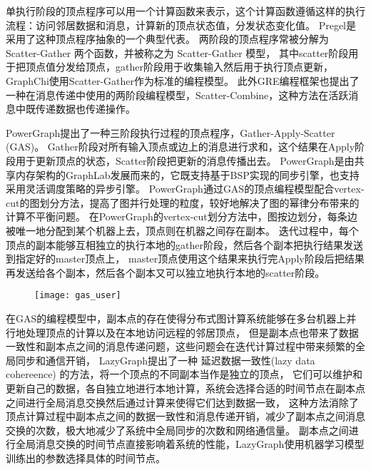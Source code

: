 单执行阶段的顶点程序可以用一个计算函数来表示，这个计算函数遵循这样的执行流程：访问邻居数据和消息，计算新的顶点状态值，分发状态变化值。
Pregel是采用了这种顶点程序抽象的一个典型代表。
两阶段的顶点程序常被分解为 Scatter-Gather 两个函数，并被称之为 Scatter-Gather 模型，
其中scatter阶段用于把顶点值分发给顶点，gather阶段用于收集输入然后用于执行顶点更新，
GraphChi\cite{GraphChi}使用Scatter-Gather作为标准的编程模型。
此外GRE\cite{GRE}编程框架也提出了一种在消息传递中使用的两阶段编程模型，Scatter-Combine，这种方法在活跃消息中既传递数据也传递操作。

PowerGraph\cite{Gonzalez@OSDI12}提出了一种三阶段执行过程的顶点程序，Gather-Apply-Scatter (GAS)。
Gather阶段对所有输入顶点或边上的消息进行求和，这个结果在Apply阶段用于更新顶点的状态，Scatter阶段把更新的消息传播出去。
PowerGraph是由共享内存架构的GraphLab\cite{Low@12}发展而来的，它既支持基于BSP实现的同步引擎，也支持采用灵活调度策略的异步引擎。
PowerGraph通过GAS的顶点编程模型配合vertex-cut的图划分方法，提高了图并行处理的粒度，较好地解决了图的幂律分布带来的计算不平衡问题。
在PowerGraph的vertex-cut划分方法中，图按边划分，每条边被唯一地分配到某个机器上去，顶点则在机器之间存在副本。
迭代过程中，每个顶点的副本能够互相独立的执行本地的gather阶段，然后各个副本把执行结果发送到指定好的master顶点上，
master顶点使用这个结果来执行完Apply阶段后把结果再发送给各个副本，然后各个副本又可以独立地执行本地的scatter阶段。


\begin{figure}[!htbp]
\centering
\texttt{[image: gas\_user]}
\end{figure}

在GAS的编程模型中，副本点的存在使得分布式图计算系统能够在多台机器上并行地处理顶点的计算以及在本地访问远程的邻居顶点，
但是副本点也带来了数据一致性和副本点之间的消息传递问题，这些问题会在迭代计算过程中带来频繁的全局同步和通信开销，
LazyGraph\cite{Wang@PPoPP18}提出了一种 延迟数据一致性(lazy data cohereence) 的方法，将一个顶点的不同副本当作是独立的顶点，
它们可以维护和更新自己的数据，各自独立地进行本地计算，系统会选择合适的时间节点在副本点之间进行全局消息交换然后通过计算来使得它们达到数据一致，
这种方法消除了顶点计算过程中副本点之间的数据一致性和消息传递开销，减少了副本点之间消息交换的次数，极大地减少了系统中全局同步的次数和网络通信量。
副本点之间进行全局消息交换的时间节点直接影响着系统的性能，LazyGraph使用机器学习模型训练出的参数选择具体的时间节点。


